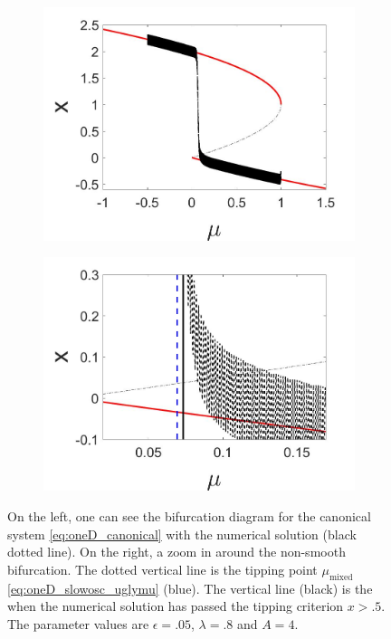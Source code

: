 \begin{figure}[H]
\centering
\begin{subfigure}{.5\textwidth}
 \centering
 \includegraphics[width=\linewidth]{oneD/slowosc_bif_diagram_small.jpg}
 \caption{}
\end{subfigure}%
\begin{subfigure}{.5\textwidth}
 \centering
 \includegraphics[width=\linewidth]{oneD/slowosc_bif_diagram_small_zoom.jpg}
 \caption{}
\end{subfigure}
\caption{On the left, one can see the bifurcation diagram for the canonical system \eqref{eq:oneD_canonical} with the numerical solution (black dotted line). On the right, a zoom in around the non-smooth bifurcation. The dotted vertical line is the tipping point $\mu_{\text{mixed}}$ \eqref{eq:oneD_slowosc_uglymu} (blue). The vertical line (black) is the when the numerical solution has passed the tipping criterion $x>.5$. The parameter values are $\epsilon=.05$, $\lambda=.8$ and $A=4$.}
\label{fig:oneD_slowosc_numerical_small}
\end{figure}

